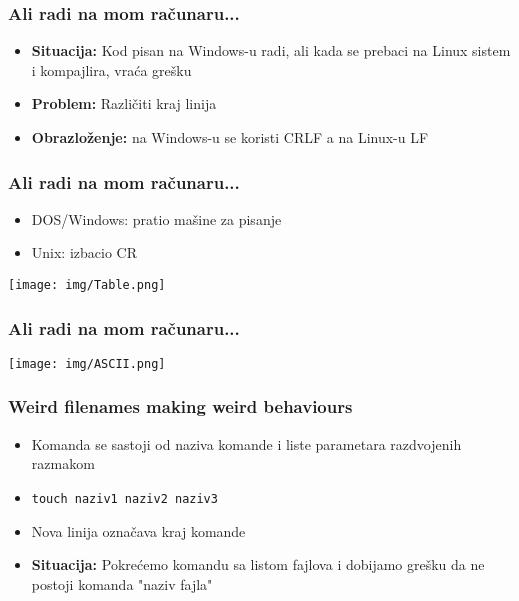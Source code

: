 \documentclass{beamer}
\begin{document}
\begin{frame}
\frametitle{Ali radi na mom računaru...}
\begin{itemize}
    \item \textbf{Situacija:} Kod pisan na Windows-u radi, ali kada se prebaci na Linux sistem i kompajlira, vraća grešku \newline
    \item \textbf{Problem:} Različiti kraj linija \newline
    \item \textbf{Obrazloženje:} na Windows-u se koristi CRLF a na Linux-u LF
\end{itemize}
\end{frame}

\begin{frame}
    \frametitle{Ali radi na mom računaru...}
    \begin{itemize}
        \item DOS/Windows: pratio mašine za pisanje \newline
        \item Unix: izbacio CR        \newline
    \end{itemize}
    \begin{center}
        \texttt{[image: img/Table.png]}
    \end{center}
    \end{frame}

\begin{frame}
    \frametitle{Ali radi na mom računaru...}
    \begin{center}
        \texttt{[image: img/ASCII.png]}
    \end{center}
\end{frame}


\begin{frame}
\frametitle{Weird filenames making weird behaviours}
\begin{itemize}
    \item Komanda se sastoji od naziva komande i liste parametara razdvojenih razmakom \newline
    \item \lstinline|touch naziv1 naziv2 naziv3| \newline
    \item Nova linija označava kraj komande \newline
    \item \textbf{Situacija:} Pokrećemo komandu sa listom fajlova i dobijamo grešku da ne postoji komanda "naziv fajla" \newline
        
\end{itemize}
\end{frame}
\end{document}
